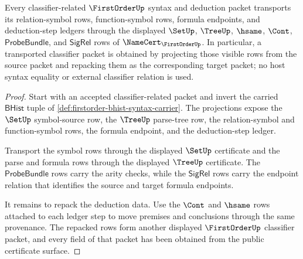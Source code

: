 \begin{theorem}\label{thm:firstorder-classifier-transport-obligation}
Every classifier-related $\FirstOrderUp$ syntax and deduction packet transports
its relation-symbol rows, function-symbol rows, formula endpoints, and
deduction-step ledgers through the displayed $\SetUp$, $\TreeUp$, $\hsame$,
$\Cont$, $\mathsf{ProbeBundle}$, and $\mathsf{SigRel}$ rows of
$\NameCert_{\FirstOrderUp}$. In particular, a transported classifier packet is
obtained by projecting those visible rows from the source packet and repacking
them as the corresponding target packet; no host syntax equality or external
classifier relation is used.
\end{theorem}
\begin{proof}
Start with an accepted classifier-related packet and invert the carried
$\mathsf{BHist}$ tuple of \autoref{def:firstorder-bhist-syntax-carrier}. The
projections expose the $\SetUp$ symbol-source row, the $\TreeUp$ parse-tree
row, the relation-symbol and function-symbol rows, the formula endpoint, and
the deduction-step ledger.

Transport the symbol rows through the displayed $\SetUp$ certificate and the
parse and formula rows through the displayed $\TreeUp$ certificate. The
$\mathsf{ProbeBundle}$ rows carry the arity checks, while the
$\mathsf{SigRel}$ rows carry the endpoint relation that identifies the source
and target formula endpoints.

It remains to repack the deduction data. Use the $\Cont$ and $\hsame$ rows
attached to each ledger step to move premises and conclusions through the same
provenance. The repacked rows form another displayed $\FirstOrderUp$
classifier packet, and every field of that packet has been obtained from the
public certificate surface.
\end{proof}

